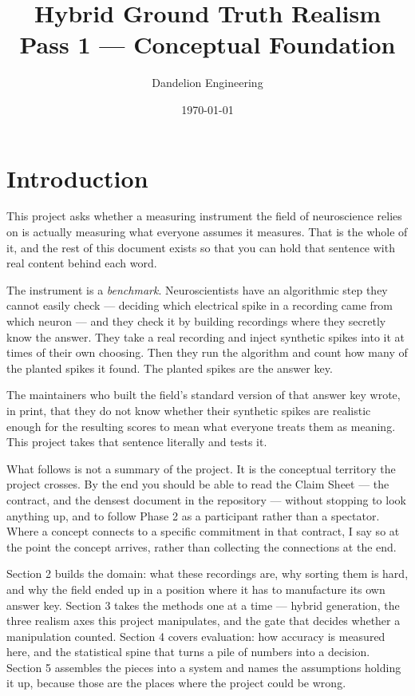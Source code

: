 \documentclass[12pt]{article}
\title{Hybrid Ground Truth Realism \\ Pass 1 --- Conceptual Foundation}
\author{Dandelion Engineering}
\date{\today}
\begin{document}
\maketitle
\tableofcontents
\newpage

\section{Introduction}

This project asks whether a measuring instrument the field of neuroscience relies on is
actually measuring what everyone assumes it measures. That is the whole of it, and the
rest of this document exists so that you can hold that sentence with real content behind
each word.

The instrument is a \emph{benchmark}. Neuroscientists have an algorithmic step they cannot
easily check --- deciding which electrical spike in a recording came from which neuron ---
and they check it by building recordings where they secretly know the answer. They take a
real recording and inject synthetic spikes into it at times of their own choosing. Then
they run the algorithm and count how many of the planted spikes it found. The planted
spikes are the answer key.

The maintainers who built the field's standard version of that answer key wrote, in print,
that they do not know whether their synthetic spikes are realistic enough for the resulting
scores to mean what everyone treats them as meaning. This project takes that sentence
literally and tests it.

What follows is not a summary of the project. It is the conceptual territory the project
crosses. By the end you should be able to read the Claim Sheet --- the contract, and the
densest document in the repository --- without stopping to look anything up, and to follow
Phase 2 as a participant rather than a spectator. Where a concept connects to a specific
commitment in that contract, I say so at the point the concept arrives, rather than
collecting the connections at the end.

Section 2 builds the domain: what these recordings are, why sorting them is hard, and why
the field ended up in a position where it has to manufacture its own answer key. Section 3
takes the methods one at a time --- hybrid generation, the three realism axes this project
manipulates, and the gate that decides whether a manipulation counted. Section 4 covers
evaluation: how accuracy is measured here, and the statistical spine that turns a pile of
numbers into a decision. Section 5 assembles the pieces into a system and names the
assumptions holding it up, because those are the places where the project could be wrong.
\end{document}
